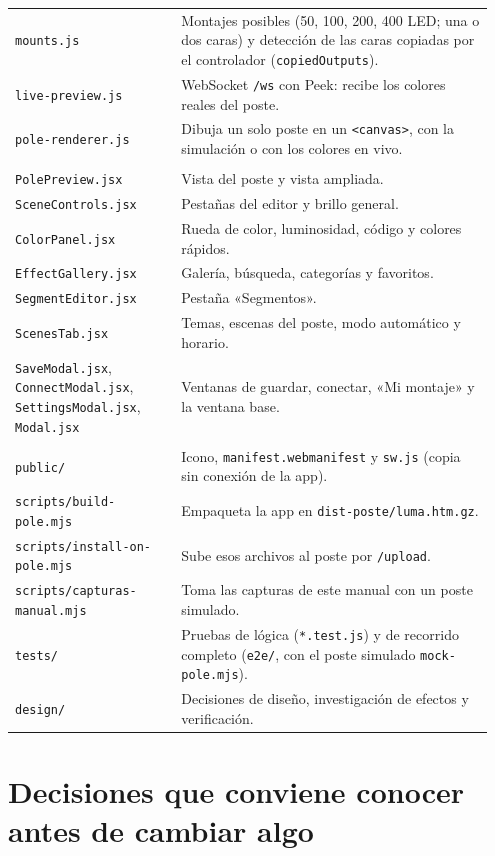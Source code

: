 \begin{longtable}{@{}>{\raggedright\arraybackslash}p{0.33\linewidth} >{\raggedright\arraybackslash}p{0.62\linewidth}@{}}
\texttt{mounts.js} & Montajes posibles (50, 100, 200, 400 LED; una o dos caras) y detección de las caras copiadas por el controlador (\texttt{copiedOutputs}). \\
\texttt{live-preview.js} & WebSocket \texttt{/ws} con Peek: recibe los colores reales del poste. \\
\texttt{pole-renderer.js} & Dibuja un solo poste en un \texttt{<canvas>}, con la simulación o con los colores en vivo. \\
\multicolumn{2}{@{}l}{\textbf{\texttt{src/components/}} (pantallas)} \\
\texttt{PolePreview.jsx} & Vista del poste y vista ampliada. \\
\texttt{SceneControls.jsx} & Pestañas del editor y brillo general. \\
\texttt{ColorPanel.jsx} & Rueda de color, luminosidad, código y colores rápidos. \\
\texttt{EffectGallery.jsx} & Galería, búsqueda, categorías y favoritos. \\
\texttt{SegmentEditor.jsx} & Pestaña «Segmentos». \\
\texttt{ScenesTab.jsx} & Temas, escenas del poste, modo automático y horario. \\
\texttt{SaveModal.jsx}, \texttt{ConnectModal.jsx}, \texttt{SettingsModal.jsx}, \texttt{Modal.jsx} & Ventanas de guardar, conectar, «Mi montaje» y la ventana base. \\
\multicolumn{2}{@{}l}{\textbf{Otros}} \\
\texttt{public/} & Icono, \texttt{manifest.webmanifest} y \texttt{sw.js} (copia sin conexión de la app). \\
\texttt{scripts/build-pole.mjs} & Empaqueta la app en \texttt{dist-poste/luma.htm.gz}. \\
\texttt{scripts/install-on-pole.mjs} & Sube esos archivos al poste por \texttt{/upload}. \\
\texttt{scripts/capturas-manual.mjs} & Toma las capturas de este manual con un poste simulado. \\
\texttt{tests/} & Pruebas de lógica (\texttt{*.test.js}) y de recorrido completo (\texttt{e2e/}, con el poste simulado \texttt{mock-pole.mjs}). \\
\texttt{design/} & Decisiones de diseño, investigación de efectos y verificación. \\
\bottomrule
\end{longtable}

\section{Decisiones que conviene conocer antes de cambiar algo}

